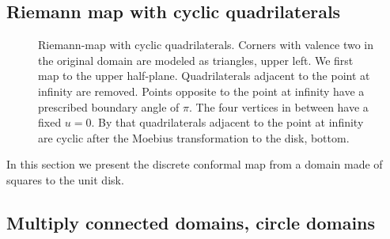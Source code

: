 \documentclass[Thesis.tex]{subfiles}
\begin{document}
\subsection{Riemann map with cyclic quadrilaterals}

\begin{figure}
\centering
{}
\caption{
Riemann-map with cyclic quadrilaterals.
Corners with valence two in the original domain are modeled as triangles, upper left.
We first map to the upper half-plane.
Quadrilaterals adjacent to the point at infinity are removed.
Points opposite to the point at infinity have a prescribed boundary angle of $\pi$.
The four vertices in between have a fixed $u=0$.
By that quadrilaterals adjacent to the point at infinity are cyclic after the Moebius transformation to the disk, bottom.
}
\label{fig:circular_riemann}
\end{figure}

In this section we present the discrete conformal map from a domain made of squares to the unit disk.


\subsection{Multiply connected domains, circle domains}
\end{document}
